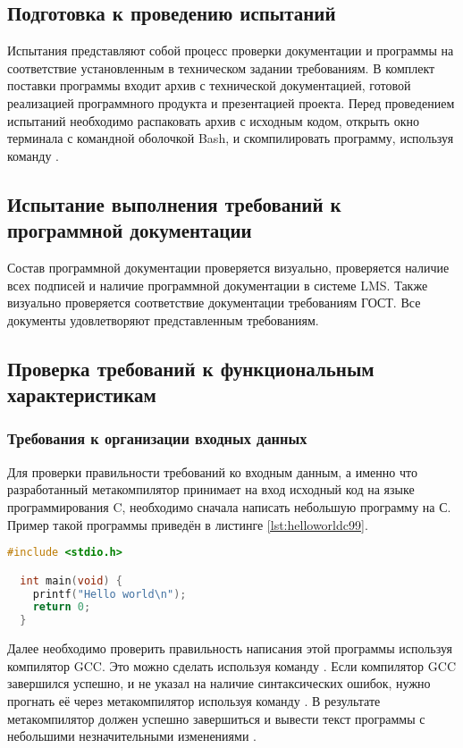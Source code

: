 \subsection{Подготовка к проведению испытаний}
Испытания представляют собой процесс проверки документации и программы на соответствие установленным в техническом задании требованиям.
В комплект поставки программы входит архив с технической документацией, готовой реализацией программного продукта и презентацией проекта.
Перед проведением испытаний необходимо распаковать архив с исходным кодом, открыть окно терминала с командной оболочкой Bash, и скомпилировать программу, используя команду .

\subsection{Испытание выполнения требований к программной документации}
Состав программной документации проверяется визуально,
проверяется наличие всех подписей и наличие программной документации в системе LMS.
Также визуально проверяется соответствие документации требованиям ГОСТ. Все документы удовлетворяют представленным требованиям.

\subsection{Проверка требований к функциональным характеристикам}
\subsubsection{Требования к организации входных данных}
Для проверки правильности требований ко входным данным, а именно что разработанный метакомпилятор принимает на вход исходный код на языке программирования C, необходимо сначала написать небольшую программу на С.
Пример такой программы приведён в листинге \ref{lst:helloworldc99}.

\begin{lstlisting}[language=c, caption={Пример простейшей программы на стандартном C}, label={lst:helloworldc99}]
  #include <stdio.h>

  int main(void) {
    printf("Hello world\n");
    return 0;
  }
\end{lstlisting}

Далее необходимо проверить правильность написания этой программы используя компилятор GCC.
Это можно сделать используя команду .
Если компилятор GCC завершился успешно, и не указал на наличие синтаксических ошибок,
нужно прогнать её через метакомпилятор используя команду .
В результате метакомпилятор должен успешно завершиться и вывести текст программы с небольшими незначительными изменениями
.

